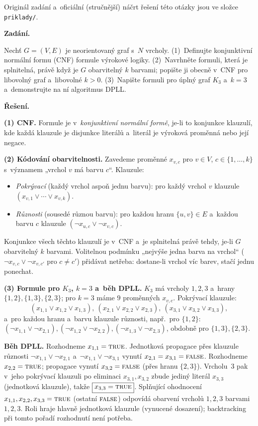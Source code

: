 \noindent Originál zadání a~oficiální (stručnější) náčrt řešení této otázky jsou ve složce \texttt{priklady/}.

\begin{priklad}
\par
\textbf{Zadání.}\par
Nechť $G=(V,E)$ je neorientovaný graf s~$N$ vrcholy. (1)~Definujte konjunktivní normální formu (CNF) formule výrokové logiky. (2)~Navrhněte formuli, která je splnitelná, právě když je $G$ obarvitelný $k$ barvami; popište ji obecně v~CNF pro libovolný graf a~libovolné $k>0$. (3)~Napište formuli pro úplný graf $K_3$ a~$k=3$ a~demonstrujte na ní algoritmus DPLL.

\medskip
\textbf{Řešení.}

\textbf{(1) CNF.} Formule je v~\emph{konjunktivní normální formě}, je-li to konjunkce klauzulí, kde každá klauzule je disjunkce literálů a~literál je výroková proměnná nebo její negace.

\textbf{(2) Kódování obarvitelnosti.} Zavedeme proměnné $x_{v,c}$ pro $v\in V$, $c\in\{1,\dots,k\}$ s~významem „vrchol $v$ má barvu $c$``. Klauzule:
\begin{itemize}
  \item \emph{Pokrývací} (každý vrchol aspoň jednu barvu): pro každý vrchol $v$ klauzule $(x_{v,1}\vee\cdots\vee x_{v,k})$.
  \item \emph{Různosti} (sousedé různou barvu): pro každou hranu $\{u,v\}\in E$ a~každou barvu $c$ klauzule $(\neg x_{u,c}\vee\neg x_{v,c})$.
\end{itemize}
Konjunkce všech těchto klauzulí je v~CNF a~je splnitelná právě tehdy, je-li $G$ obarvitelný $k$ barvami. Volitelnou podmínku „nejvýše jedna barva na vrchol`` ($\neg x_{v,c}\vee\neg x_{v,c'}$ pro $c\neq c'$) přidávat netřeba: dostane-li vrchol víc barev, stačí jednu ponechat.

\textbf{(3) Formule pro $K_3$, $k=3$ a~běh DPLL.} $K_3$ má vrcholy $1,2,3$ a~hrany $\{1,2\},\{1,3\},\{2,3\}$; pro $k=3$ máme $9$ proměnných $x_{v,c}$. Pokrývací klauzule:
\[ (x_{1,1}\vee x_{1,2}\vee x_{1,3}),\ (x_{2,1}\vee x_{2,2}\vee x_{2,3}),\ (x_{3,1}\vee x_{3,2}\vee x_{3,3}), \]
a~pro každou hranu a~barvu klauzule různosti, např.\ pro $\{1,2\}$: $(\neg x_{1,1}\vee\neg x_{2,1}),(\neg x_{1,2}\vee\neg x_{2,2}),(\neg x_{1,3}\vee\neg x_{2,3})$, obdobně pro $\{1,3\},\{2,3\}$.

\textbf{Běh DPLL.} Rozhodneme $x_{1,1}=\textsc{true}$. Jednotková propagace přes klauzule různosti $\neg x_{1,1}\vee\neg x_{2,1}$ a~$\neg x_{1,1}\vee\neg x_{3,1}$ vynutí $x_{2,1}=x_{3,1}=\textsc{false}$. Rozhodneme $x_{2,2}=\textsc{true}$; propagace vynutí $x_{3,2}=\textsc{false}$ (přes hranu $\{2,3\}$). Vrcholu~$3$ pak v~jeho pokrývací klauzuli po eliminaci $x_{3,1},x_{3,2}$ zbude jediný literál $x_{3,3}$ (jednotková klauzule), takže $\boxed{x_{3,3}=\textsc{true}}$. Splňující ohodnocení $x_{1,1},x_{2,2},x_{3,3}=\textsc{true}$ (ostatní $\textsc{false}$) odpovídá obarvení vrcholů $1,2,3$ barvami $1,2,3$. Roli hraje hlavně jednotková klauzule (vynucené dosazení); backtracking při tomto pořadí rozhodnutí není potřeba.
\end{priklad}

